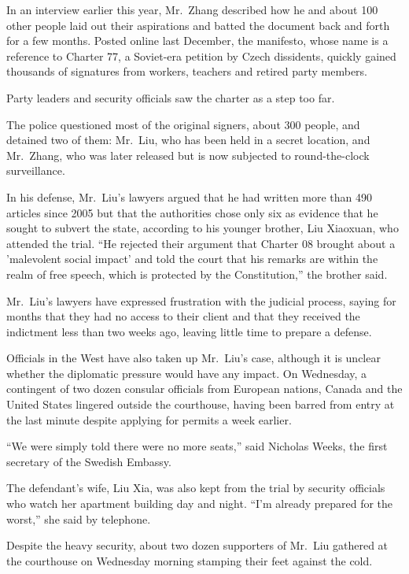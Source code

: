 ﻿\documentclass[12pt]{article}
\begin{document}
In an interview earlier this year, Mr.~Zhang described how he and about 100 other people laid out
their aspirations and batted the document back and forth for a few months. Posted online last
December, the manifesto, whose name is a reference to Charter 77, a Soviet-era petition by Czech
dissidents, quickly gained thousands of signatures from workers, teachers and retired party members.

Party leaders and security officials saw the charter as a step too far.

The police questioned most of the original signers, about 300 people, and detained two of them:
Mr.~Liu, who has been held in a secret location, and Mr.~Zhang, who was later released but is now
subjected to round-the-clock surveillance.

In his defense, Mr.~Liu's lawyers argued that he had written more than 490 articles since 2005 but
that the authorities chose only six as evidence that he sought to subvert the state, according to
his younger brother, Liu Xiaoxuan, who attended the trial. ``He rejected their argument that Charter
08 brought about a 'malevolent social impact' and told the court that his remarks are within the
realm of free speech, which is protected by the Constitution,'' the brother said.

Mr.~Liu's lawyers have expressed frustration with the judicial process, saying for months that they
had no access to their client and that they received the indictment less than two weeks ago, leaving
little time to prepare a defense.

Officials in the West have also taken up Mr.~Liu's case, although it is unclear whether the
diplomatic pressure would have any impact. On Wednesday, a contingent of two dozen consular
officials from European nations, Canada and the United States lingered outside the courthouse,
having been barred from entry at the last minute despite applying for permits a week earlier.

``We were simply told there were no more seats,'' said Nicholas Weeks, the first secretary of the
Swedish Embassy.

The defendant's wife, Liu Xia, was also kept from the trial by security officials who watch her
apartment building day and night. ``I'm already prepared for the worst,'' she said by telephone.

Despite the heavy security, about two dozen supporters of Mr.~Liu gathered at the courthouse on
Wednesday morning stamping their feet against the cold.
\end{document}
